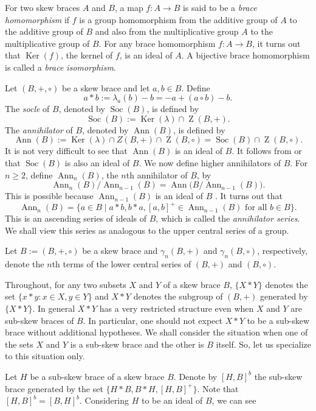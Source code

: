\documentclass[10pt,a4paper]{amsart}
\numberwithin{equation}{section}
\newcommand{\Z}{\operatorname{Z} }
\newcommand{\Ker}{\operatorname{Ker} }
\newcommand{\Soc}{\operatorname{Soc} }
\newcommand{\Ann}{\operatorname{Ann} }
\begin{document}
    
    
For two skew braces $A$ and $B$, a map $f : A \to B$ is said to be a {\it brace homomorphism} if $f$ is a group homomorphism from the additive group of $A$ to the additive group of $B$ and also from the multiplicative group $A$ to the multiplicative group of $B$. For any brace homomorphism $f : A \to B$, it turns out that $\Ker(f)$, the kernel of $f$,  is an ideal of $A$. A bijective brace homomorphism is called a {\it brace isomorphism}. 


Let $(B,+,\circ)$ be a skew brace and let $a,b\in B$. Define 
$$a \ast b := \lambda_a(b) - b = -a + (a \circ b) - b.$$
 The  {\it socle} of $B$,  denoted by $\Soc(B)$, is defined by 
 $$\Soc(B) := \Ker(\lambda) \cap \Z(B,+).$$
The  {\it annihilator} of $B$, denoted by $\Ann(B)$, is defined by 
 $$\Ann(B) := \Ker(\lambda) \cap Z(B,+) \cap \Z(B, \circ) = \Soc(B) \cap  \Z(B, \circ).$$
 It is not very difficult to see that  $\Ann(B)$  is an ideal of $B$. It  follows from \cite[Lemma 2.5]{GV17} or \cite[Proposition 2.9]{BEP24} that   $\Soc(B)$ is also an ideal of $B$. We now define higher annihilators of $B$. For $n \geqslant 2$, define $\Ann_n(B)$, the $n$th annihilator  of $B$, by
$$\Ann_n(B) / \Ann_{n-1}(B) = \Ann\big(B /  \Ann_{n-1}(B)\big).$$
This is possible because $\Ann_{n-1}(B)$ is an ideal of $B$ \cite[Definition 2.2]{JAV23}.  It turns out that 
$$\Ann_n(B) = \{a \in B \mid a*b, b*a,  [a, b]^{+}  \in \Ann_{n-1}(B) \mbox{ for all } b \in B\}.$$
This is an ascending series of ideals of $B$, which is called the  \textit{annihilator series}. We shall view this series as analogous to the upper central series of a group.

Let $B := (B, +, \circ)$ be a skew  brace and $\gamma_n(B, +)$ and  $\gamma_n(B, \circ)$, respectively, denote the $n$th terms of the lower central series of $(B, +)$ and $(B, \circ)$.  


Throughout, for any two subsets $X$ and $Y$ of a skew brace $B$, $\{X*Y\}$  denotes the set $\{x*y: x \in X, y\in Y\}$ and  $X * Y$ denotes the subgroup of $(B, +)$ generated by $\{X*Y\}$. In general $X * Y$ has a very restricted structure even when $X$ and $Y$ are sub-skew braces of $B$. In particular, one should not expect $X*Y$ to be a sub-skew brace without additional hypotheses. We shall consider the situation when  one of the sets $X$ and $Y$ is a sub-skew brace  and the other is $B$ itself. So, let us specialize to this situation only.
 
Let $H$ be a sub-skew brace of a skew brace $B$. Denote by $[H, B]^b$ the sub-skew brace generated by the set $\{ H*B, B*H, [H, B]^+\}$. Note that  $[H, B]^b = [B, H]^b$. Considering $H$ to be an ideal of $B$, we can see
 
\end{document}
